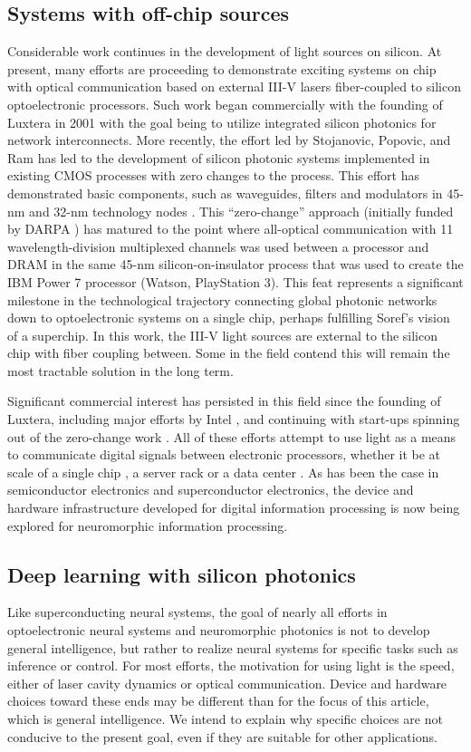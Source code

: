 \documentclass[twocolumn]{article}
\begin{document}
\subsection{Systems with off-chip sources}
Considerable work continues in the development of light sources on silicon. At present, many efforts are proceeding to demonstrate exciting systems on chip with optical communication based on external III-V lasers fiber-coupled to silicon optoelectronic processors. Such work began commercially with the founding of Luxtera in 2001 with the goal being to utilize integrated silicon photonics for network interconnects. More recently, the effort led by Stojanovic, Popovic, and Ram has led to the development of silicon photonic systems implemented in existing CMOS processes with zero changes to the process. This effort has demonstrated basic components, such as waveguides, filters and modulators in 45-nm \cite{orma2012,shor2014,meor2014} and 32-nm technology nodes \cite{}. This ``zero-change'' approach (initially funded by DARPA \cite{}) has matured to the point where all-optical communication with 11 wavelength-division multiplexed channels was used between a processor and DRAM \cite{suwa2015,suwa2017} in the same 45-nm silicon-on-insulator process that was used to create the IBM Power 7 processor (Watson, PlayStation 3). This feat represents a significant milestone in the technological trajectory connecting global photonic networks down to optoelectronic systems on a single chip, perhaps fulfilling Soref's vision of a superchip. In this work, the III-V light sources are external to the silicon chip with fiber coupling between. Some in the field contend this will remain the most tractable solution in the long term. 

Significant commercial interest has persisted in this field since the founding of Luxtera, including major efforts by Intel \cite{}, and continuing with start-ups spinning out of the zero-change work \cite{}. All of these efforts attempt to use light as a means to communicate digital signals between electronic processors, whether it be at scale of a single chip \cite{suwa2015}, a server rack \cite{} or a data center \cite{}. As has been the case in semiconductor electronics and superconductor electronics, the device and hardware infrastructure developed for digital information processing is now being explored for neuromorphic information processing. 

\subsection{Deep learning with silicon photonics}
Like superconducting neural systems, the goal of nearly all efforts in optoelectronic neural systems and neuromorphic photonics is not to develop general intelligence, but rather to realize neural systems for specific tasks such as inference or control. For most efforts, the motivation for using light is the speed, either of laser cavity dynamics or optical communication. Device and hardware choices toward these ends may be different than for the focus of this article, which is general intelligence. We intend to explain why specific choices are not conducive to the present goal, even if they are suitable for other applications.
\end{document}
